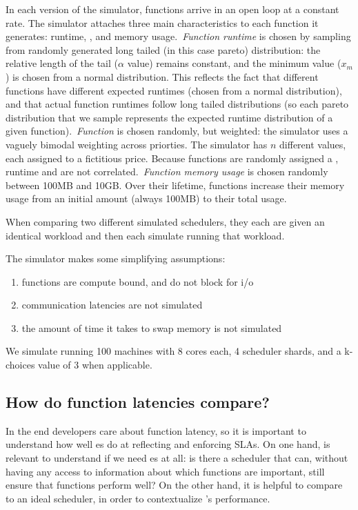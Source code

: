In each version of the simulator, functions arrive in an open loop at a constant
rate. The simulator attaches three main characteristics to each function it
generates: runtime, \priceclass{}, and memory usage.\ \textit{Function runtime}
is chosen by sampling from randomly generated long tailed (in this case pareto)
distribution: the relative length of the tail ($\alpha$ value) remains constant,
and the minimum value ($x_m$) is chosen from a normal distribution. This
reflects the fact that different functions have different expected runtimes
(chosen from a normal distribution), and that actual function runtimes follow
long tailed distributions (so each pareto distribution that we sample represents
the expected runtime distribution of a given function).\ \textit{Function
\class{}} is chosen randomly, but weighted: the simulator uses a vaguely bimodal
weighting across priorties. The simulator has $n$ different \priceclass{} values,
each assigned to a fictitious price. Because functions are randomly assigned a
\class{}, runtime and \class{} are not correlated.\ \textit{Function memory
usage} is chosen randomly between 100MB and 10GB. Over their lifetime, functions
increase their memory usage from an initial amount (always 100MB) to their total
usage.

When comparing two different simulated schedulers, they each are given an
identical workload and then each simulate running that workload.

The simulator makes some simplifying assumptions:
\begin{enumerate}
    \item functions are compute bound, and do not block for i/o
    \item communication latencies are not simulated
    \item the amount of time it takes to swap memory is not simulated
\end{enumerate}

We simulate running 100 machines with 8 cores each, 4 scheduler shards, and a
k-choices value of 3 when applicable.

\subsection{How do function latencies compare?}

In the end developers care about function latency, so it is important to
understand how well \priceclass{}es do at reflecting and enforcing SLAs. On one
hand, is relevant to understand if we need \class{}es at all: is there a
scheduler that can, without having any access to information about which
functions are important, still ensure that functions perform well? On the other
hand, it is helpful to compare \sys{} to an ideal scheduler, in order to
contextualize \sys{}'s performance.

